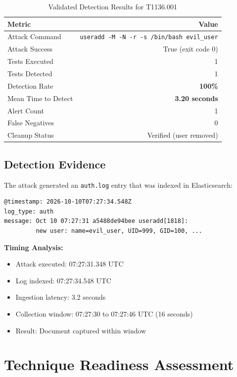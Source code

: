 \documentclass[11pt,a4paper]{article}
\begin{document}
\begin{table}[H]
    \centering
    \caption{Validated Detection Results for T1136.001}
    \begin{tabular}{lr}
        \toprule
        \textbf{Metric} & \textbf{Value} \\
        \midrule
        Attack Command & \texttt{useradd -M -N -r -s /bin/bash evil\_user} \\
        Attack Success & True (exit code 0) \\
        Tests Executed & 1 \\
        Tests Detected & 1 \\
        Detection Rate & \textbf{100\%} \\
        Mean Time to Detect & \textbf{3.20 seconds} \\
        Alert Count & 1 \\
        False Negatives & 0 \\
        Cleanup Status & Verified (user removed) \\
        \bottomrule
    \end{tabular}
\end{table}

\subsection{Detection Evidence}

The attack generated an \texttt{auth.log} entry that was indexed in Elasticsearch:

\begin{verbatim}
@timestamp: 2026-10-10T07:27:34.548Z
log_type: auth
message: Oct 10 07:27:31 a5488de94bee useradd[1818]:
         new user: name=evil_user, UID=999, GID=100, ...
\end{verbatim}

\textbf{Timing Analysis:}
\begin{itemize}
    \item Attack executed: 07:27:31.348 UTC
    \item Log indexed: 07:27:34.548 UTC
    \item Ingestion latency: 3.2 seconds
    \item Collection window: 07:27:30 to 07:27:46 UTC (16 seconds)
    \item Result: Document captured within window
\end{itemize}

\section{Technique Readiness Assessment}
\label{sec:readiness}
\end{document}
